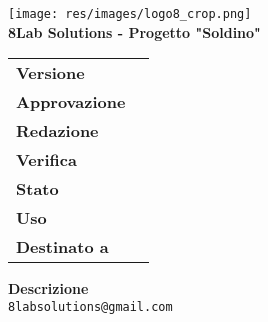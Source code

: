 \thispagestyle{empty}
\begin{titlepage}
	\begin{center}
		\texttt{[image: res/images/logo8\_crop.png]}\\
		\large \textbf{8Lab Solutions - Progetto "Soldino"} \\
		\vfill
		\Huge \textbf{\doctitle}
		\vspace*{\fill}
        
        \vfill
        \large
    \end{center}
	\begin{table}[htbp]
        \centering
        \hspace*{2cm}
        \begin{tabular}{l|l}
            \textbf{Versione} & \rev{} \\
            \linespread{2}
            \textbf{Approvazione} & \approv{} \\
            \linespread{2}
            \textbf{Redazione} & \red{} \\
            \linespread{2}
            \textbf{Verifica} & \ver{} \\
            \linespread{2}
            \textbf{Stato} & \stato{} \\
            \linespread{2}
            \textbf{Uso} & \uso{} \\
            \linespread{2}
            \textbf{Destinato a} & \destinatari{} \\
        \end{tabular}
    \end{table}
    \begin{center}
        \vfill
        \normalsize
        \textbf{Descrizione}\\
		\describedoc
        \vfill
        \small
        \texttt{8labsolutions@gmail.com}
	\end{center}
\end{titlepage}
